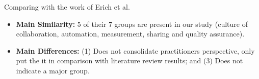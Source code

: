 Comparing with the work of Erich et al.~\cite{qualitative_devops_journalsw_17}
\begin{itemize}
\item \textbf{Main Similarity:} 5 of their 7 groups are present in our study
(culture of collaboration, automation, measurement, sharing and quality assurance).
\item \textbf{Main Differences:} (1) Does not consolidate practitioners
perspective, only put the it in comparison with literature review results; and
(3) Does not indicate a major group.
\end{itemize}

%
%
%
%
%
%
%
%
%
%
%
%
